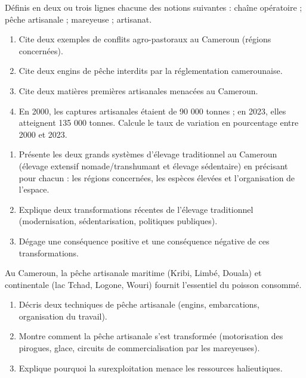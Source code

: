 \documentclass[11pt]{article}
\newcommand{\cle}[1]{{\popxbold\color{popdark}#1}}
\newcounter{popsec}
\newcounter{popsub}
\newcommand{\courssub}[1]{%
  \stepcounter{popsub}%
  \par\vspace{9pt}\noindent{\popxbold\fontsize{11.5}{13}\selectfont\color{popink}{\color{poporange}\thepopsec.\thepopsub}\hspace{6pt}#1}\par\nopagebreak\vspace{4pt}
}
\begin{document}
\begin{exercice}[Définitions]
Définis en deux ou trois lignes chacune des notions suivantes : \cle{chaîne opératoire} ; \cle{pêche artisanale} ; \cle{mareyeuse} ; \cle{artisanat}.
\end{exercice}

\begin{exercice}
\begin{enumerate}
\item Cite deux exemples de \cle{conflits agro-pastoraux} au Cameroun (régions concernées).
\item Cite deux \cle{engins de pêche interdits} par la réglementation camerounaise.
\item Cite deux \cle{matières premières artisanales menacées} au Cameroun.
\item En 2000, les captures artisanales étaient de 90 000 tonnes ; en 2023, elles atteignent 135 000 tonnes. Calcule le taux de variation en pourcentage entre 2000 et 2023.
\end{enumerate}
\end{exercice}

\courssub{Je m'entraîne}

\begin{exercice}
\begin{enumerate}
\item Présente les deux grands systèmes d'élevage traditionnel au Cameroun (élevage extensif nomade/transhumant et élevage sédentaire) en précisant pour chacun : les régions concernées, les espèces élevées et l'organisation de l'espace.
\item Explique deux transformations récentes de l'élevage traditionnel (modernisation, sédentarisation, politiques publiques).
\item Dégage une conséquence positive et une conséquence négative de ces transformations.
\end{enumerate}
\end{exercice}

\begin{exercice}
Au Cameroun, la pêche artisanale maritime (Kribi, Limbé, Douala) et continentale (lac Tchad, Logone, Wouri) fournit l'essentiel du poisson consommé.
\begin{enumerate}
\item Décris deux techniques de pêche artisanale (engins, embarcations, organisation du travail).
\item Montre comment la pêche artisanale s'est transformée (motorisation des pirogues, glace, circuits de commercialisation par les mareyeuses).
\item Explique pourquoi la surexploitation menace les ressources halieutiques.
\end{enumerate}
\end{exercice}
\end{document}
